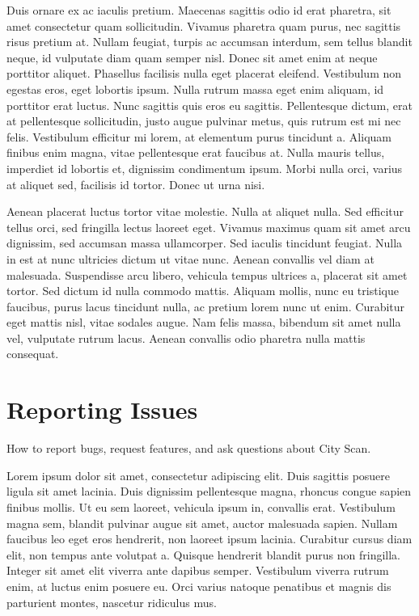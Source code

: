 \documentclass[
  letterpaper,
  DIV=11,
  numbers=noendperiod]{scrreprt}
\begin{document}
Duis ornare ex ac iaculis pretium. Maecenas sagittis odio id erat
pharetra, sit amet consectetur quam sollicitudin. Vivamus pharetra quam
purus, nec sagittis risus pretium at. Nullam feugiat, turpis ac accumsan
interdum, sem tellus blandit neque, id vulputate diam quam semper nisl.
Donec sit amet enim at neque porttitor aliquet. Phasellus facilisis
nulla eget placerat eleifend. Vestibulum non egestas eros, eget lobortis
ipsum. Nulla rutrum massa eget enim aliquam, id porttitor erat luctus.
Nunc sagittis quis eros eu sagittis. Pellentesque dictum, erat at
pellentesque sollicitudin, justo augue pulvinar metus, quis rutrum est
mi nec felis. Vestibulum efficitur mi lorem, at elementum purus
tincidunt a. Aliquam finibus enim magna, vitae pellentesque erat
faucibus at. Nulla mauris tellus, imperdiet id lobortis et, dignissim
condimentum ipsum. Morbi nulla orci, varius at aliquet sed, facilisis id
tortor. Donec ut urna nisi.

Aenean placerat luctus tortor vitae molestie. Nulla at aliquet nulla.
Sed efficitur tellus orci, sed fringilla lectus laoreet eget. Vivamus
maximus quam sit amet arcu dignissim, sed accumsan massa ullamcorper.
Sed iaculis tincidunt feugiat. Nulla in est at nunc ultricies dictum ut
vitae nunc. Aenean convallis vel diam at malesuada. Suspendisse arcu
libero, vehicula tempus ultrices a, placerat sit amet tortor. Sed dictum
id nulla commodo mattis. Aliquam mollis, nunc eu tristique faucibus,
purus lacus tincidunt nulla, ac pretium lorem nunc ut enim. Curabitur
eget mattis nisl, vitae sodales augue. Nam felis massa, bibendum sit
amet nulla vel, vulputate rutrum lacus. Aenean convallis odio pharetra
nulla mattis consequat.

\chapter{Reporting Issues}\label{reporting-issues}

How to report bugs, request features, and ask questions about City Scan.

Lorem ipsum dolor sit amet, consectetur adipiscing elit. Duis sagittis
posuere ligula sit amet lacinia. Duis dignissim pellentesque magna,
rhoncus congue sapien finibus mollis. Ut eu sem laoreet, vehicula ipsum
in, convallis erat. Vestibulum magna sem, blandit pulvinar augue sit
amet, auctor malesuada sapien. Nullam faucibus leo eget eros hendrerit,
non laoreet ipsum lacinia. Curabitur cursus diam elit, non tempus ante
volutpat a. Quisque hendrerit blandit purus non fringilla. Integer sit
amet elit viverra ante dapibus semper. Vestibulum viverra rutrum enim,
at luctus enim posuere eu. Orci varius natoque penatibus et magnis dis
parturient montes, nascetur ridiculus mus.
\end{document}
